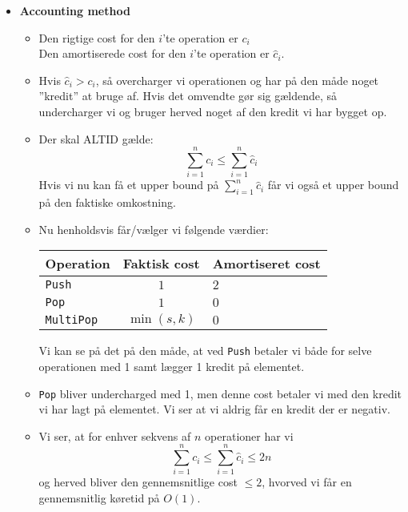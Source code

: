 \begin{itemize}
\item \textbf{Accounting method}
\begin{itemize}
	\item Den rigtige cost for den $i$'te operation er $c_i$\\
	Den amortiserede cost for den $i$'te operation er $\hat c_i$.
	\item Hvis $\hat c_i > c_i$, så overcharger vi operationen og har på den måde noget ''kredit'' at bruge af. Hvis det omvendte gør sig gældende, så undercharger vi og bruger herved noget af den kredit vi har bygget op.
	\item Der skal ALTID gælde:
	$$
	\sum_{i=1}^n c_i \leq \sum_{i=1}^n \hat c_i
	$$
	Hvis vi nu kan få et upper bound på $\sum_{i=1}^n \hat c_i$ får vi også et upper bound på den faktiske omkostning.
	\item Nu henholdsvis får/vælger vi følgende værdier:
	\begin{table}[H] \begin{center}
		\begin{tabular}{l|c|l}
			\textbf{Operation} & \textbf{Faktisk cost} & \textbf{Amortiseret cost} \\ \hline
			\texttt{Push}      & $1$                   & $2$                       \\
			\texttt{Pop}       & $1$                   & $0$                       \\
			\texttt{MultiPop}  & $\min(s, k)$          & $0$
		\end{tabular} \end{center}
	\end{table}
	Vi kan se på det på den måde, at ved \texttt{Push} betaler vi både for selve operationen med 1 samt lægger 1 kredit på elementet.
	\item \texttt{Pop} bliver undercharged med 1, men denne cost betaler vi med den kredit vi har lagt på elementet. Vi ser at vi aldrig får en kredit der er negativ.
	\item Vi ser, at for enhver sekvens af $n$ operationer har vi
	$$
	\sum_{i=1}^n c_i \leq \sum_{i=1}^n \hat c_i \leq 2n
	$$
	og herved bliver den gennemsnitlige cost $\leq 2$, hvorved vi får en gennemsnitlig køretid på $O(1)$.
\end{itemize}






\end{itemize}
